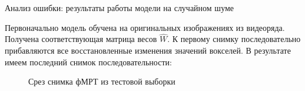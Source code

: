 \documentclass[9pt,pdf]{beamer} %
\begin{document}
\begin{frame}{Анализ ошибки: результаты работы модели на случайном шуме}

Первоначально модель обучена на оригинальных изображениях из видеоряда.
Получена соответствующая матрица весов $\hat{W}$. 
К первому снимку последовательно прибавляются все восстановленные изменения значений вокселей. 
В результате имеем последний снимок последовательности:
\begin{figure}[h!]
    \centering
    \hfill
    \hfill
    \caption{Срез снимка фМРТ из тестовой выборки}
    \label{fig:7}
\end{figure}
\end{frame}
\end{document}
